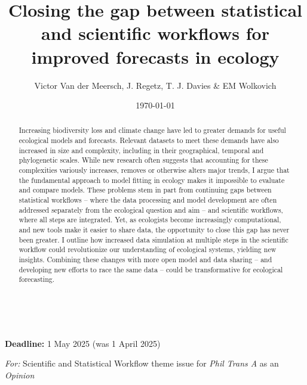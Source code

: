 \documentclass[11pt]{article}
\begin{document}
\renewcommand{\refname}{\CHead{}}

\title{Closing the gap between statistical and scientific workflows for improved forecasts in ecology } 
\date{\today}
\author{Victor Van der Meersch, J. Regetz, T. J. Davies \& EM Wolkovich}\\
 \maketitle

{\bf Deadline:} 1 May 2025 (was 1 April 2025)

\emph{For:} Scientific and Statistical Workflow theme issue for \emph{Phil Trans A} as an \emph{Opinion}

\begin{abstract}
Increasing biodiversity loss and climate change have led to greater demands for useful ecological models and forecasts. Relevant datasets to meet these demands have also increased in size and complexity, including in their geographical, temporal and phylogenetic scales. While new research often suggests that accounting for these complexities variously increases, removes or otherwise alters major trends, I argue that the fundamental approach to model fitting in ecology makes it impossible to evaluate and compare models. These problems stem in part from continuing gaps between statistical workflows -- where the data processing and model development are often addressed separately from the ecological question and aim -- and scientific workflows, where all steps are integrated. Yet, as ecologists become increasingly computational, and new tools make it easier to share data, the opportunity to close this gap has never been greater. I outline how increased data simulation at multiple steps in the scientific workflow could revolutionize our understanding of ecological systems, yielding new insights. Combining these changes with more open model and data sharing -- and developing new efforts to race the same data -- could be transformative for ecological forecasting. 
\end{abstract}
\end{document}

